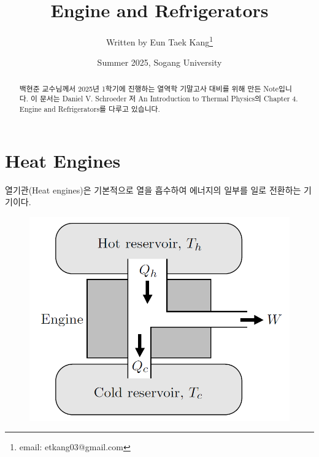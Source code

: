 \documentclass{article}
\title{\textsf{Engine and Refrigerators}}
\author[1]{Written by Eun Taek Kang\thanks{email: etkang03@gmail.com}}
\affil[1]{Department of Physics, Sogang University, Seoul 04107, Korea}
\date{Summer 2025, Sogang University}
\begin{document}
\pagestyle{fancy}
    \fancyhf{}
    \fancyfoot[C]{\thepage}

\maketitle

\begin{abstract}
    백현준 교수님께서 2025년 1학기에 진행하는 열역학 기말고사 대비를 위해 만든 Note입니다. 이 문서는 Daniel V. Schroeder 저 An Introduction to Thermal Physics의 Chapter 4. Engine and Refrigerators를 다루고 있습니다.
\end{abstract}

\newpage

\section{Heat Engines}

열기관(Heat engines)은 기본적으로 열을 흡수하여 에너지의 일부를 일로 전환하는 기기이다.  

\begin{figure}[h]
    \centering
    \includegraphics[width=0.35\linewidth]{images/fig1_1.png}
\end{figure}
\end{document}
